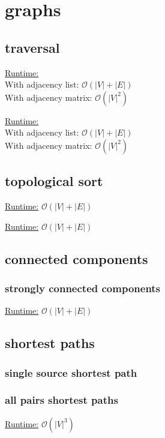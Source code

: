 \section{graphs}
\subsection{traversal}

\underline{Runtime:}\\
With adjacency list: $\mathcal{O}(\lvert V \rvert + \lvert E \rvert)$ \\
With adjacency matrix: $\mathcal{O}(\lvert V \rvert^2)$

\underline{Runtime:}\\
With adjacency list: $\mathcal{O}(\lvert V \rvert + \lvert E \rvert)$ \\
With adjacency matrix: $\mathcal{O}(\lvert V \rvert^2)$


\subsection{topological sort}

\underline{Runtime:} $\mathcal{O}(\lvert V \rvert + \lvert E \rvert)$

\underline{Runtime:} $\mathcal{O}(\lvert V \rvert + \lvert E \rvert)$


\subsection{connected components}

\subsubsection{strongly connected components}
\underline{Runtime:} $\mathcal{O}(\lvert V \rvert + \lvert E \rvert)$



\subsection{shortest paths}

\subsubsection{single source shortest path}



\subsubsection{all pairs shortest paths}
\underline{Runtime:} $\mathcal{O}(\lvert V \rvert^3)$



